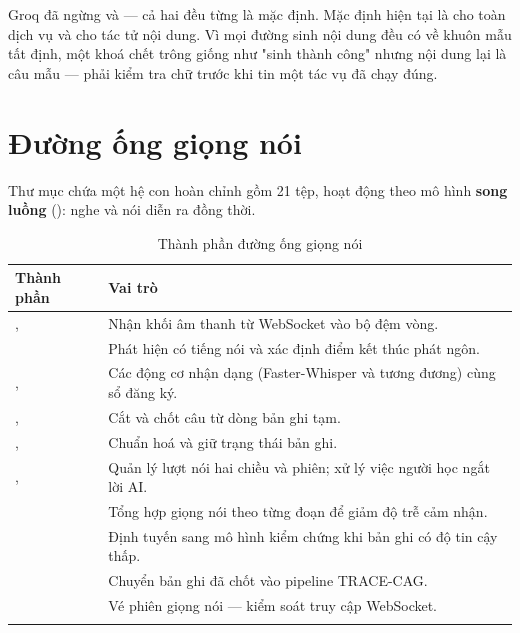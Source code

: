 \begin{luuy}
Groq đã ngừng  và  — cả hai đều
từng là mặc định. Mặc định hiện tại là  cho toàn dịch vụ và
 cho tác tử nội dung. Vì mọi đường sinh nội dung đều có
 về khuôn mẫu tất định, một khoá chết trông giống như "sinh thành công"
nhưng nội dung lại là câu mẫu — phải kiểm tra chữ trước khi tin một tác vụ đã chạy đúng.
\end{luuy}

\section{Đường ống giọng nói}

Thư mục  chứa một hệ con hoàn chỉnh gồm 21 tệp, hoạt động theo mô hình
\textbf{song luồng} (): nghe và nói diễn ra đồng thời.

\begin{longtable}{L{3.8cm} L{9.8cm}}
\toprule
\textbf{Thành phần} & \textbf{Vai trò}\\
\midrule
\endhead
{},  & Nhận khối âm thanh từ WebSocket vào bộ đệm vòng.\\
 & Phát hiện có tiếng nói và xác định điểm kết thúc phát ngôn.\\
,  & Các động cơ nhận dạng (Faster-Whisper và tương đương) cùng sổ đăng ký.\\
,  & Cắt và chốt câu từ dòng bản ghi tạm.\\
,  & Chuẩn hoá và giữ trạng thái bản ghi.\\
,  & Quản lý lượt nói hai chiều và phiên; xử lý việc người học ngắt lời AI.\\
 & Tổng hợp giọng nói theo từng đoạn để giảm độ trễ cảm nhận.\\
 & Định tuyến sang mô hình kiểm chứng khi bản ghi có độ tin cậy thấp.\\
 & Chuyển bản ghi đã chốt vào pipeline TRACE-CAG.\\
 & Vé phiên giọng nói — kiểm soát truy cập WebSocket.\\
\bottomrule
\caption{Thành phần đường ống giọng nói}
\end{longtable}

